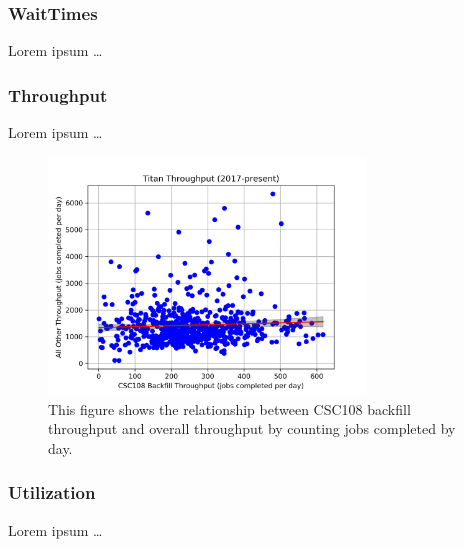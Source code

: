 \subsubsection{WaitTimes}
\label{subsubsec:waittimes}

Lorem ipsum \ldots






\subsubsection{Throughput}
\label{subsubsec:throughput}

Lorem ipsum \ldots


\begin{figure}
  \includegraphics[width=0.75\textwidth]{images/linfit-throughput-all.png}
\caption{This figure shows the relationship between CSC108 backfill throughput
and overall throughput by counting jobs completed by day.}
\label{fig:throughput-all}
\end{figure}




\subsubsection{Utilization}
\label{subsubsec:utilization}

Lorem ipsum \ldots





